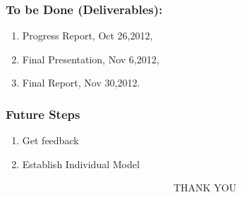 \documentclass[compress,handout,10pt]{beamer}
\let\olditem\item
\renewcommand{\item}{\setlength{\itemsep}{0.5\baselineskip}\olditem}
\begin{document}
\begin{frame}
  \frametitle{To be Done (Deliverables):}
	\begin{enumerate}
	      \item Progress Report, Oct 26,2012,
                 \item Final Presentation, Nov 6,2012,
                 \item Final Report, Nov 30,2012.	
	\end{enumerate}
\end{frame}

\begin{frame}
  \frametitle{Future Steps}
	\begin {enumerate}
		\item Get feedback
		\item Establish Individual Model
	\end{enumerate}
\end{frame}

\begin{frame}
\vspace{20pt}
~~~~~~~~~~~~~~~~~~~~~~~~~~~~~~~~~~THANK YOU
\end{frame}

%
%
\end{document}
